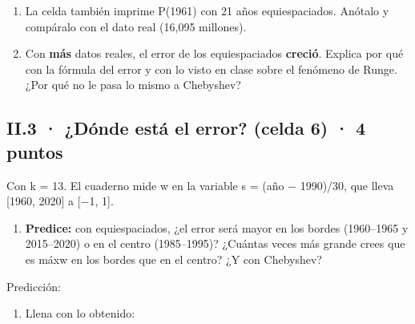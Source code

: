 \begin{enumerate}
\def\labelenumi{(\alph{enumi})}
\setcounter{enumi}{1}
\item
  La celda también imprime P(1961) con 21 años equiespaciados. Anótalo y compáralo con el dato real (16,095 millones).
\item
  Con \textbf{más} datos reales, el error de los equiespaciados \textbf{creció}. Explica por qué con la fórmula del error y con lo visto en clase sobre el fenómeno de Runge. ¿Por qué no le pasa lo mismo a Chebyshev?
\end{enumerate}

\subsection{II.3 · ¿Dónde está el error? (celda 6) · 4 puntos}

Con k = 13. El cuaderno mide w en la variable s = (año − 1990)/30, que lleva {[}1960, 2020{]} a {[}−1, 1{]}.

\begin{enumerate}
\def\labelenumi{(\alph{enumi})}
\tightlist
\item
  \textbf{Predice:} con equiespaciados, ¿el error será mayor en los bordes (1960--1965 y 2015--2020) o en el centro (1985--1995)? ¿Cuántas veces más grande crees que es máx\textbar w\textbar{} en los bordes que en el centro? ¿Y con Chebyshev?
\end{enumerate}

Predicción: 

\begin{enumerate}
\def\labelenumi{(\alph{enumi})}
\setcounter{enumi}{1}
\tightlist
\item
  Llena con lo obtenido:
\end{enumerate}

